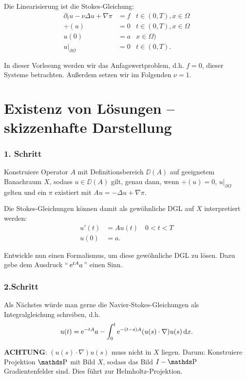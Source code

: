 Die Linearisierung ist die Stokes-Gleichung:
\begin{align*}
  \partial_t u - \nu \Delta u + \nabla \pi &= f & t \in (0,T), x \in \Omega \\
  \div(u) &= 0 &t \in (0,T), x \in \Omega \\
  u(0) &= a & x \in \Omega) \\
  u|_{\partial\Omega} &= 0 & t \in (0,T).
\end{align*}

In dieser Vorlesung werden wir das Anfagswertproblem, d.h. $f = 0$, dieser Systeme betrachten. 
Außerdem setzen wir im Folgenden $\nu = 1$.

\section{Existenz von Lösungen -- skizzenhafte Darstellung}

\subsubsection*{1. Schritt}

Konstruiere Operator $A$ mit Definitionsbereich $\DD(A)$ auf geeignetem Banachraum $X$, sodass $u \in \DD(A)$ gilt, genau dann, wenn $\div(u) = 0$, $u|_{\partial \Omega}$ gelten und ein $\pi$ existiert mit $Au = -\Delta u + \nabla \pi$.

Die Stokes-Gleichungen können damit als gewöhnliche DGL auf $X$ interpretiert werden:
\begin{align*}
  u'(t) &= Au(t) \quad 0 < t < T\\
  u(0) &= a.
\end{align*}

Entwickle nun einen Formalismus, um diese gewöhnliche DGL zu lösen. Dazu gebe dem Ausdruck ``$\, \mathrm{e}^{tA} a \, $'' einen Sinn.

\subsubsection*{2.Schritt}

Als Nächstes würde man gerne die Navier-Stokes-Gleichungen als Integralgleichung schreiben, d.h.
$$
 u(t) = \mathrm{e}^{-tA} a - \int_0^t \mathrm{e}^{-(t - s)A} (u(s) \cdot \nabla) u(s) \, {\operatorname{d}\!{x}}.
$$

\textbf{ACHTUNG}: $(u(s) \cdot \nabla) u(s)$ muss nicht in $X$ liegen. Darum: Konstruiere Projektion $\PP$ mit Bild $X$, sodass das Bild $I - \PP$ Gradientenfelder sind. Dies führt zur Helmholtz-Projektion.

